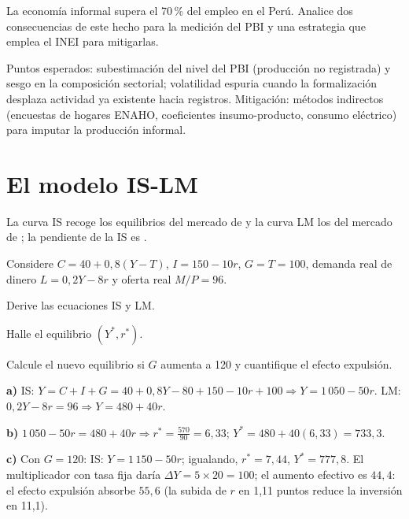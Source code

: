 \documentclass[claves]{evaluacion}
\begin{document}
\begin{pregunta}[][An · Desarrollo]
La economía informal supera el 70\,\% del empleo en el Perú. Analice dos
consecuencias de este hecho para la medición del PBI y una estrategia que
emplea el INEI para mitigarlas.
\begin{solucion}
Puntos esperados: subestimación del nivel del PBI (producción no
registrada) y sesgo en la composición sectorial; volatilidad espuria
cuando la formalización desplaza actividad ya existente hacia registros.
Mitigación: métodos indirectos (encuestas de hogares ENAHO, coeficientes
insumo-producto, consumo eléctrico) para imputar la producción informal.
\end{solucion}
\end{pregunta}

\section{El modelo IS-LM}

\begin{pregunta}[][R · Completar]
La curva IS recoge los equilibrios del mercado de
\completar[bienes]{2.8cm} y la curva LM los del mercado de
\completar[dinero]{2.8cm}; la pendiente de la IS es
\completar[negativa]{2.8cm}.
\end{pregunta}

\begin{pregunta}[][A · Problema]
Considere $C = 40 + 0{,}8(Y - T)$, $I = 150 - 10r$, $G = T = 100$,
demanda real de dinero $L = 0{,}2Y - 8r$ y oferta real $M/P = 96$.
\begin{apartados}
  \item Derive las ecuaciones IS y LM. 
  \item Halle el equilibrio $(Y^{*}, r^{*})$. 
  \item Calcule el nuevo equilibrio si $G$ aumenta a 120 y cuantifique el
        efecto expulsión. 
\end{apartados}
\begin{solucion}
\textbf{a)} IS: $Y = C+I+G = 40+0{,}8Y-80+150-10r+100
\Rightarrow Y = 1\,050 - 50r$.
LM: $0{,}2Y - 8r = 96 \Rightarrow Y = 480 + 40r$.

\textbf{b)} $1\,050 - 50r = 480 + 40r \Rightarrow r^{*} = \frac{570}{90}
= 6{,}33$; $Y^{*} = 480+40(6{,}33) = 733{,}3$.

\textbf{c)} Con $G=120$: IS: $Y = 1\,150 - 50r$; igualando,
$r^{*} = 7{,}44$, $Y^{*} = 777{,}8$. El multiplicador con tasa fija
daría $\Delta Y = 5\times20 = 100$; el aumento efectivo es $44{,}4$:
el efecto expulsión absorbe $55{,}6$ (la subida de $r$ en 1,11 puntos
reduce la inversión en 11,1).
\end{solucion}
\end{pregunta}
\end{document}
